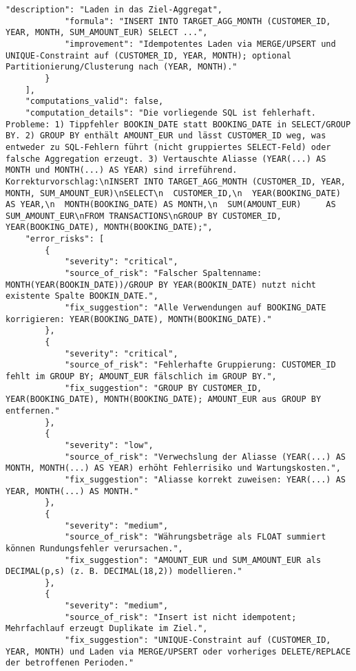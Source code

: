 \begin{lstlisting}[caption={Ausgabe: GPT-5 Anwendungsfall 1 Robustheitsdurchlauf},label={gpt_case1_prompt3}]
            "description": "Laden in das Ziel-Aggregat",
            "formula": "INSERT INTO TARGET_AGG_MONTH (CUSTOMER_ID, YEAR, MONTH, SUM_AMOUNT_EUR) SELECT ...",
            "improvement": "Idempotentes Laden via MERGE/UPSERT und UNIQUE-Constraint auf (CUSTOMER_ID, YEAR, MONTH); optional Partitionierung/Clusterung nach (YEAR, MONTH)."
        }
    ],
    "computations_valid": false,
    "computation_details": "Die vorliegende SQL ist fehlerhaft. Probleme: 1) Tippfehler BOOKIN_DATE statt BOOKING_DATE in SELECT/GROUP BY. 2) GROUP BY enthält AMOUNT_EUR und lässt CUSTOMER_ID weg, was entweder zu SQL-Fehlern führt (nicht gruppiertes SELECT-Feld) oder falsche Aggregation erzeugt. 3) Vertauschte Aliasse (YEAR(...) AS MONTH und MONTH(...) AS YEAR) sind irreführend. Korrekturvorschlag:\nINSERT INTO TARGET_AGG_MONTH (CUSTOMER_ID, YEAR, MONTH, SUM_AMOUNT_EUR)\nSELECT\n  CUSTOMER_ID,\n  YEAR(BOOKING_DATE)  AS YEAR,\n  MONTH(BOOKING_DATE) AS MONTH,\n  SUM(AMOUNT_EUR)     AS SUM_AMOUNT_EUR\nFROM TRANSACTIONS\nGROUP BY CUSTOMER_ID, YEAR(BOOKING_DATE), MONTH(BOOKING_DATE);",
    "error_risks": [
        {
            "severity": "critical",
            "source_of_risk": "Falscher Spaltenname: MONTH(YEAR(BOOKIN_DATE))/GROUP BY YEAR(BOOKIN_DATE) nutzt nicht existente Spalte BOOKIN_DATE.",
            "fix_suggestion": "Alle Verwendungen auf BOOKING_DATE korrigieren: YEAR(BOOKING_DATE), MONTH(BOOKING_DATE)."
        },
        {
            "severity": "critical",
            "source_of_risk": "Fehlerhafte Gruppierung: CUSTOMER_ID fehlt im GROUP BY; AMOUNT_EUR fälschlich im GROUP BY.",
            "fix_suggestion": "GROUP BY CUSTOMER_ID, YEAR(BOOKING_DATE), MONTH(BOOKING_DATE); AMOUNT_EUR aus GROUP BY entfernen."
        },
        {
            "severity": "low",
            "source_of_risk": "Verwechslung der Aliasse (YEAR(...) AS MONTH, MONTH(...) AS YEAR) erhöht Fehlerrisiko und Wartungskosten.",
            "fix_suggestion": "Aliasse korrekt zuweisen: YEAR(...) AS YEAR, MONTH(...) AS MONTH."
        },
        {
            "severity": "medium",
            "source_of_risk": "Währungsbeträge als FLOAT summiert können Rundungsfehler verursachen.",
            "fix_suggestion": "AMOUNT_EUR und SUM_AMOUNT_EUR als DECIMAL(p,s) (z. B. DECIMAL(18,2)) modellieren."
        },
        {
            "severity": "medium",
            "source_of_risk": "Insert ist nicht idempotent; Mehrfachlauf erzeugt Duplikate im Ziel.",
            "fix_suggestion": "UNIQUE-Constraint auf (CUSTOMER_ID, YEAR, MONTH) und Laden via MERGE/UPSERT oder vorheriges DELETE/REPLACE der betroffenen Perioden."

\end{lstlisting}

